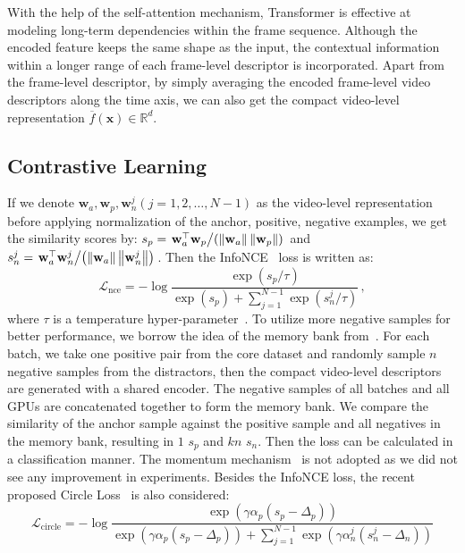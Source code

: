 \documentclass[10pt,twocolumn,letterpaper]{article}
\begin{document}
With the help of the self-attention mechanism, Transformer is effective at modeling long-term dependencies within the frame sequence. Although the encoded feature keeps the same shape as the input, the contextual information within a longer range of each frame-level descriptor is incorporated. Apart from the frame-level descriptor, by simply averaging the encoded frame-level video descriptors along the time axis, we can also get the compact video-level representation $\overline{f}(\mathbf{x}) \in \mathbb{R}^{d}$. 

\subsection{Contrastive Learning} \label{subsection:contlearn}
If we denote $\mathbf{w}_a, \mathbf{w}_p, \mathbf{w}_n^j (j=1,2,\dots,N-1)$ as the video-level representation before applying normalization of the anchor, positive, negative examples, we get the similarity scores by: $s_p=\left. \mathbf{w}_{a}^{\top}\mathbf{w}_{p} \middle/ \left( \left\|\mathbf{w}_{a}\right\| \left\|\mathbf{w}_{p}\right\| \right) \right.$ and $s_n^j=\left. \mathbf{w}_{a}^{\top}\mathbf{w}_{n}^{j} \middle/ \left( \left\|\mathbf{w}_{a}\right\| \left\|\mathbf{w}_{n}^{j}\right\| \right) \right.$. Then the InfoNCE~\cite{oord2018representation} loss is written as:
{\small
\begin{equation} \label{eq:nce}
    \mathcal{L}_{\text{nce}}=-\log \frac{\exp \left(s_{p} / \tau\right)}{\exp \left(s_{p}\right) + \sum_{j=1}^{N-1} \exp \left( s_{n}^{j} / \tau\right)} \,,
\end{equation}
}
where $\tau$ is a temperature hyper-parameter~\cite{wu2018unsupervised}. To utilize more negative samples for better performance, we borrow the idea of the memory bank from~\cite{wu2018unsupervised}. For each batch, we take one positive pair from the core dataset and randomly sample $n$ negative samples from the distractors, then the compact video-level descriptors are generated with a shared encoder. The negative samples of all batches and all GPUs are concatenated together to form the memory bank. We compare the similarity of the anchor sample against the positive sample and all negatives in the memory bank, resulting in $1$ $s_p$ and $kn$ $s_n$. Then the loss can be calculated in a classification manner. The momentum mechanism~\cite{he2019momentum} is not adopted as we did not see any improvement in experiments. Besides the InfoNCE loss, the recent proposed Circle Loss~\cite{sun2020circle} is also considered:
{\small
\begin{equation} \label{eq:circle}
\mathcal{L}_{\text{circle}}= -\log \frac{\exp (\gamma \alpha_{p} ( s_{p} - \Delta_{p} ))}{\exp (\gamma \alpha_{p} ( s_{p} - \Delta_{p} )) + \sum\limits_{j=1}^{N-1} \exp (\gamma \alpha_{n}^{j} ( s_{n}^{j} - \Delta_{n} ))}
\end{equation}
}
\end{document}
